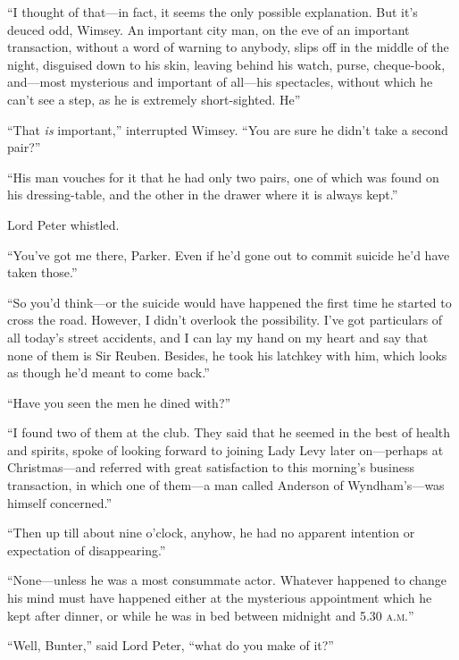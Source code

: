 \enquote{I thought of that\allowbreak---\allowbreak in fact, it seems the only possible explanation. But it’s deuced odd, Wimsey. An important city man, on the eve of an important transaction, without a word of warning to anybody, slips off in the middle of the night, disguised down to his skin, leaving behind his watch, purse, cheque-book, and\allowbreak---\allowbreak most mysterious and important of all\allowbreak---\allowbreak his spectacles, without which he can’t see a step, as he is extremely short-sighted. He\longdash}

\enquote{That \textit{is} important,} interrupted Wimsey. \enquote{You are sure he didn’t take a second pair?}

\enquote{His man vouches for it that he had only two pairs, one of which was found on his dressing-table, and the other in the drawer where it is always kept.}

Lord Peter whistled.

\enquote{You’ve got me there, Parker. Even if he’d gone out to commit suicide he’d have taken those.}

\enquote{So you’d think\allowbreak---\allowbreak or the suicide would have happened the first time he started to cross the road. However, I didn’t overlook the possibility. I’ve got particulars of all today’s street accidents, and I can lay my hand on my heart and say that none of them is Sir Reuben. Besides, he took his latchkey with him, which looks as though he’d meant to come back.}

\enquote{Have you seen the men he dined with?}

\enquote{I found two of them at the club. They said that he seemed in the best of health and spirits, spoke of looking forward to joining Lady Levy later on\allowbreak---\allowbreak perhaps at Christmas\allowbreak---\allowbreak and referred with great satisfaction to this morning’s business transaction, in which one of them\allowbreak---\allowbreak a man called Anderson of Wyndham’s\allowbreak---\allowbreak was himself concerned.}

\enquote{Then up till about nine o’clock, anyhow, he had no apparent intention or expectation of disappearing.}

\enquote{None\allowbreak---\allowbreak unless he was a most consummate actor. Whatever happened to change his mind must have happened either at the mysterious appointment which he kept after dinner, or while he was in bed between midnight and 5.30 \textsc{a.m.}}

\enquote{Well, Bunter,} said Lord Peter, \enquote{what do you make of it?}

